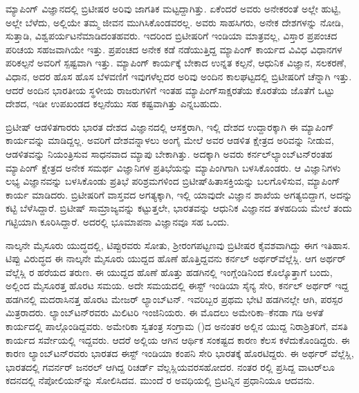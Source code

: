 ಮ್ಯಾಪಿಂಗ್​ ವಿಜ್ಞಾನದಲ್ಲಿ ಬ್ರಿಟೀಷರ ಅರಿವು ಜಾಗತಿಕ ಮಟ್ಟದ್ದಾಗಿತ್ತು. ಏಕೆಂದರೆ ಅವರು ಅನೇಕರಂತೆ ಅಲ್ಲೇ ಹುಟ್ಟಿ, ಅಲ್ಲೇ ಬೆಳೆದು, ಅಲ್ಲಿಯೇ ತಮ್ಮ ಜೀವನ ಮುಗಿಸಿಕೊಂಡವರಲ್ಲ. ಅವರು ಸಾಹಸಿಗರು, ಅನೇಕ ದೇಶಗಳನ್ನು ನೋಡಿ, ಸುತ್ತಾಡಿ, ವಿಶ್ವಪರ್ಯಟನೆ\break ಮಾಡಿದಂತಹವರು. ಇದರಿಂದ ಬ್ರಿಟೀಷರಿಗೆ ಇಂಡಿಯಾ ಮಾತ್ರವಲ್ಲ, ವಿಸ್ತಾರ ಪ್ರಪಂಚದ ಪರಿಚಯ ಸಹಜವಾಗಿಯೇ ಇತ್ತು. ಪ್ರಪಂಚದ ಅನೇಕ ಕಡೆ ನಡೆಯುತ್ತಿದ್ದ ಮ್ಯಾಪಿಂಗ್​ ಕಾರ್ಯದ ವಿವಿಧ ವಿಧಾನಗಳ ಪರಿಕಲ್ಪನೆ ಅವರಿಗೆ ಸ್ಪಷ್ಟವಾಗಿ ಇತ್ತು. ಮ್ಯಾಪಿಂಗ್​ ಕಾರ್ಯಕ್ಕೆ ಬೇಕಾದ ಉನ್ನತ ಕಲ್ಪನೆ, ಆಧುನಿಕ ವಿಜ್ಞಾನ, ಸಲಕರಣೆ, ವಿಧಾನ, ಅದರ ಹೊಸ ಹೊಸ ಬೆಳವಣಿಗೆ ಇವುಗಳೆಲ್ಲದರ ಅರಿವು ಅಂದಿನ ಕಾಲಘಟ್ಟದಲ್ಲಿ ಬ್ರಿಟೀಷರಿಗೆ ಚೆನ್ನಾಗಿ ಇತ್ತು. ಆದರೆ ಅಂದಿನ ಭಾರತೀಯ ಸ್ಥಳೀಯ ರಾಜರುಗಳಿಗೆ ಇಂತಹ ಮ್ಯಾಪಿಂಗ್​ ಸಾಕ್ಷರತೆಯ ಕೊರತೆಯ ಜೊತೆಗೆ ಒಟ್ಟು ದೇಶದ, ಇಡೀ ಉಪಖಂಡದ ಕಲ್ಪನೆಯು ಸಹ ಕಷ್ಟವಾಗಿತ್ತು ಎನ್ನಬಹುದು.

ಬ್ರಿಟೀಷ್​ ಆಡಳಿತಗಾರರು ಭಾರತ ದೇಶದ ವಿಜ್ಞಾನದಲ್ಲಿ ಆಸಕ್ತರಾಗಿ, ಇಲ್ಲಿ ದೇಶದ ಉದ್ದಾರಕ್ಕಾಗಿ ಈ ಮ್ಯಾಪಿಂಗ್​ ಕಾರ್ಯವನ್ನು ಮಾಡಿದ್ದಲ್ಲ. ಅವರಿಗೆ ದೇಶವನ್ನಾಳಲು ಅಂಗೈ ಮೇಲೆ ಅವರ ಆಡಳಿತ ಕ್ಷೇತ್ರದ ಅರಿವನ್ನು ನೀಡುವ, ಆಡಳಿತವನ್ನು ನಿಯಂತ್ರಿಸುವ ಸಾಧನವಾದ ಮ್ಯಾಪು ಬೇಕಾಗಿತ್ತು. ಅದಕ್ಕಾಗಿ ಅವರು ಕರ್ನಲ್​ ಲ್ಯಾಂಬ್​ಟನ್​ರಂತಹ ಮ್ಯಾಪಿಂಗ್​ ಕ್ಷೇತ್ರದ ಅನೇಕ ಸಮರ್ಥ ವಿಜ್ಞಾನಿಗಳ ಪ್ರತಿಭೆಯನ್ನು ಮ್ಯಾಪಿಂಗಿಗಾಗಿ ಬಳಸಿಕೊಂಡರು. ಆ ವಿಜ್ಞಾನಿಗಳು ಲಭ್ಯ ವಿಜ್ಞಾನವನ್ನು ಬಳಸಿಕೊಂಡು ಪ್ರತಿಭೆ ಪರಿಶ್ರಮಗಳಿಂದ ಬ್ರಿಟೀಷ್​ ಹಿತಾಸಕ್ತಿಯನ್ನು ಬಲಗೊಳಿಸುವ, ಮ್ಯಾಪಿಂಗ್​ ಕಾರ್ಯ ಮಾಡಿದರು. ಬ್ರಿಟೀಷರಿಗೆ ವಾಸ್ತವದ ಅಗತ್ಯಕ್ಕಾಗಿ, ಇಲ್ಲಿ ಯಾವುದೇ ವಿಜ್ಞಾನ ಶಾಖೆಯ ಅಗತ್ಯಬಿದ್ದಾಗ, ಅದನ್ನು ಕಟ್ಟಿ ಬೆಳೆಸಿದ್ದಾರೆ. ಬ್ರಿಟೀಷ್​ ಸಾಮ್ರಾಜ್ಯವನ್ನು ಕಟ್ಟುತ್ತಲೇ, ಭಾರತವನ್ನು ಆಧುನಿಕ ವಿಜ್ಞಾನದ ತಳಹದಿಯ ಮೇಲೆ ತಂದು ಗಟ್ಟಿಯಾಗಿ ಕೂರಿಸಿದ್ದಾರೆ. ಅದರಲ್ಲಿ ಭೂಮಾಪನಾ ವಿಜ್ಞಾನವೂ ಸಹ ಒಂದು.

ನಾಲ್ಕನೇ ಮೈಸೂರು ಯುದ್ಧದಲ್ಲಿ, ಟಿಪ್ಪುರವರು ಸೋತು, ಶ‍್ರೀರಂಗಪಟ್ಟಣವು ಬ್ರಿಟೀಷರ ಕೈವಶವಾಗಿದ್ದು ಈಗ ಇತಿಹಾಸ. ಟಿಪ್ಪು ವಿರುದ್ಧದ ಈ ನಾಲ್ಕನೇ ಮೈಸೂರು ಯುದ್ದದ ಹೊಣೆ ಹೊತ್ತಿದ್ದವನು ಕರ್ನಲ್​ ಅರ್ಥರ್​ ವೆಲ್ಲೆಸ್ಲಿ. ಆಗ ಅರ್ಥರ್​ ವೆಲ್ಲೆಸ್ಲಿ ರ ಹರೆಯದ ತರುಣ. ಈ ಯುದ್ದದ ಹೊಣೆ ಹೊತ್ತು ಹಡಗಿನಲ್ಲಿ ಇಂಗ್ಲೆಂಡಿನಿಂದ ಕೊಲ್ಕೊತ್ತಾಗೆ ಬಂದು, ಅಲ್ಲಿಂದ ಮೈಸೂರತ್ತ ಹೊರಟ ಸಮಯ. ಅದೇ ಸಮಯದಲ್ಲಿ ಈಸ್ಟ್​ ಇಂಡಿಯಾ ಸೈನ್ಯ ಸೇರಿ, ಕರ್ನಲ್​ ಅರ್ಥರ್​ ಇದ್ದ ಹಡಗಿನಲ್ಲಿ ಮದರಾಸಿನತ್ತ ಹೊರಟ ಮೇಜರ್​ ಲ್ಯಾಂಬ್​ಟನ್​. ಇವರಿಬ್ಬರ ಪ್ರಥಮ ಭೇಟಿ ಹಡಗಿನಲ್ಲೇ ಆಗಿ, ಪರಸ್ಪರ ಮಿತ್ರರಾದರು. ಲ್ಯಾಂಬ್​ಟನ್​ರವರು ಮಿಲಿಟರಿ ಇಂಜಿನಿಯರು. ಈ ಮೊದಲು ಅಮೇರಿಕಾ–ಕೆನಡಾ ಗಡಿ ಅಳತೆ ಕಾರ್ಯದಲ್ಲಿ ಪಾಲ್ಗೊಂಡಿದ್ದವರು. ಅಮೇರಿಕಾ ಸ್ವತಂತ್ರ ಸಂಗ್ರಾಮ ()ದ ಅನಂತರ ಅಲ್ಲಿನ ಯುದ್ದ ನಿರಾಶ್ರಿತರಿಗೆ, ವಸತಿ ಕಾರ್ಯದ ಸರ್ವೇಯಲ್ಲಿ ಇದ್ದವರು. ಆದರೆ ಅಲ್ಲಿಯ ಆಗಿನ ಆರ್ಥಿಕ ಸಂಕಷ್ಟದ ಕಾರಣ ಕೆಲಸ ಕಳೆದುಕೊಂಡಿದ್ದರು. ಈ ಕಾರಣ ಲ್ಯಾಂಬ್​ಟನ್​ರವರು ಭಾರತದ ಈಸ್ಟ್​ ಇಂಡಿಯಾ ಕಂಪನಿ ಸೇರಿ ಭಾರತಕ್ಕೆ ಹೊರಟಿದ್ದರು. ಈ ಅರ್ಥರ್​ ವೆಲ್ಲೆಸ್ಲಿ, ಭಾರತದಲ್ಲಿ ಗವರ್ನರ್​ ಜನರಲ್​ ಆಗಿದ್ದ ರಿಚರ್ಡ್ ವೆಲ್ಲಸ್ಲಿಯವರ\break ಸಹೋದರ. ನಂತರ  ರಲ್ಲಿ ಪ್ರಸಿದ್ದ ವಾಟರ್​ಲೂ ಕದನದಲ್ಲಿ ನೆಪೋಲಿಯನ್‌ನ್ನು ಸೋಲಿಸಿದವ. ಮುಂದೆ  ರ ಅವಧಿಯಲ್ಲಿ ಬ್ರಿಟನ್ನಿನ ಪ್ರಧಾನಿಯೂ ಆದವನು.


